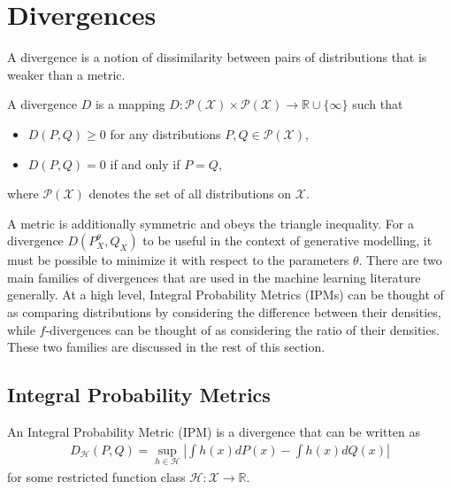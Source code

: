 \section{Divergences}\label{subsec:gen-model-divergence}

A divergence is a notion of dissimilarity between pairs of distributions that is weaker than a metric.

\medskip

\begin{definition}
A divergence $D$ is a mapping $D: \mathcal{P}(\mathcal{X}) \times \mathcal{P}(\mathcal{X}) \to \mathbb{R} \cup \{\infty\}$ such that

\begin{itemize}
\item $D(P, Q)  \geq 0$ for any distributions $P, Q \in \mathcal{P}(\mathcal{X})$,
\item $D(P, Q) = 0$ if and only if $P = Q$,
\end{itemize}

where $\mathcal{P}(\mathcal{X})$ denotes the set of all distributions on $\mathcal{X}$.
\end{definition}


A metric is additionally symmetric and obeys the triangle inequality.
For a divergence $D(P^\theta_X, Q_X)$ to be useful in the context of generative modelling, it must be possible to minimize it with respect to the parameters $\theta$. 
There are two main families of divergences that are used in the machine learning literature generally.
At a high level, Integral Probability Metrics (IPMs) can be thought of as comparing distributions by considering the difference between their densities, while $f$-divergences can be thought of as considering the ratio of their densities.
These two families are discussed in the rest of this section.

\subsection{Integral Probability Metrics}\label{subsec:intro-ipm}

\begin{definition}
An Integral Probability Metric (IPM) is a divergence that can be written as
%
\begin{align*}
D_{\mathcal{H}}(P, Q) = \sup_{h\in\mathcal{H}} \left| \int h(x) dP(x) - \int h(x) dQ(x) \right|
\end{align*}
%
for some restricted function class $\mathcal{H}: \mathcal{X} \to \mathbb{R}$. 
\end{definition}

